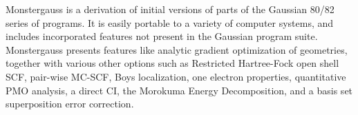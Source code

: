 Monstergauss is a derivation of initial versions of parts of the Gaussian 80/82 series of programs. It is easily portable to a variety of computer systems, and includes incorporated features not present in the Gaussian program suite. Monstergauss presents features like analytic gradient optimization of geometries, together with various other options such as Restricted Hartree-Fock open shell SCF, pair-wise MC-SCF, Boys localization, one electron properties, quantitative PMO analysis, a direct CI, the Morokuma Energy Decomposition, and a basis set superposition error correction.